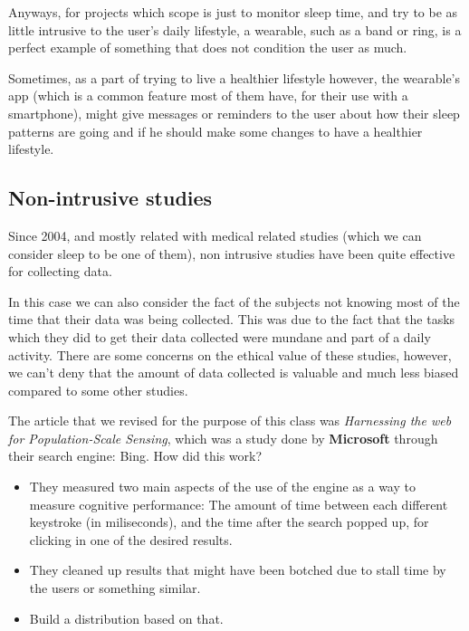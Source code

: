 \documentclass[]{IEEEtran}
\begin{document}
Anyways, for projects which scope is just to monitor sleep time, and try to be as little intrusive to the user's daily lifestyle, a wearable, such as a band or ring, is a perfect example of something that does not condition the user as much. \par 

Sometimes, as a part of trying to live a healthier lifestyle however, the wearable's app (which is a common feature most of them have, for their use with a smartphone), might give messages or reminders to the user about how their sleep patterns are going and if he should make some changes to have a healthier lifestyle. 

\subsection{Non-intrusive studies}

Since 2004, and mostly related with medical related studies (which we can consider sleep to be one of them), non intrusive studies have been quite effective for collecting data.

In this case we can also consider the fact of the subjects not knowing most of the time that their data was being collected. This was due to the fact that the tasks which they did to get their data collected were mundane and part of a daily activity. There are some concerns on the ethical value of these studies, however, we can't deny that the amount of data collected is valuable and much less biased compared to some other studies. \par

The article that we revised for the purpose of this class was \textit{Harnessing the web for Population-Scale Sensing}, which was a study done by \textbf{Microsoft} through their search engine: Bing. How did this work? 

\begin{itemize}
    \item They measured two main aspects of the use of the engine as a way to measure cognitive performance: The amount of time between each different keystroke (in miliseconds), and the time after the search popped up, for clicking in one of the desired results.
    \item They cleaned up results that might have been botched due to stall time by the users or something similar.
    \item Build a distribution based on that.
\end{itemize}
\end{document}
